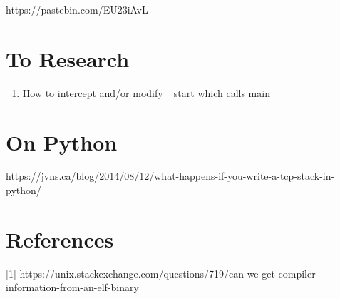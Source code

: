 https://pastebin.com/EU23iAvL

\section{To Research}

\begin{enumerate}
\item How to intercept and/or modify \_start which calls main
\end{enumerate}

\section{On Python}

https://jvns.ca/blog/2014/08/12/what-happens-if-you-write-a-tcp-stack-in-python/

\section{References}

[1] https://unix.stackexchange.com/questions/719/can-we-get-compiler-information-from-an-elf-binary
